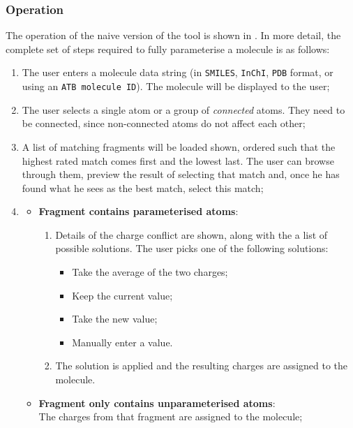 \subsubsection{Operation}
The operation of the naive version of the tool is shown in . In more detail, the complete set of steps required to fully parameterise a molecule is as follows:
\begin{enumerate}[itemsep=.1em, parsep=.2em, topsep=0em]
\item The user enters a molecule data string (in \verb|SMILES|, \verb|InChI|, \verb|PDB| format, or using an \verb|ATB molecule ID|). The molecule will be displayed to the user;
\item The user selects a single atom or a group of \emph{connected} atoms. They need to be connected, since non-connected atoms do not affect each other;
\item A list of matching fragments will be loaded shown, ordered such that the highest rated match comes first and the lowest last. The user can browse through them, preview the result of selecting that match and, once he has found what he sees as the best match, select this match;
\item
  \begin{itemize}[leftmargin=0cm, itemsep=.1em, parsep=.1em]
  \item[]{\bf Fragment contains parameterised atoms}:
    \begin{enumerate}
    \item
      Details of the charge conflict are shown, along with the a list of possible solutions. The user picks one of the following solutions:
      \begin{itemize}[itemsep=.1em, parsep=.2em, topsep=0em]
      \item Take the average of the two charges;
      \item Keep the current value;
      \item Take the new value;
      \item Manually enter a value.
      \end{itemize}
    \item The solution is applied and the resulting charges are assigned to the molecule.
    \end{enumerate}
  \item[] {\bf Fragment only contains unparameterised atoms}:\\
    The charges from that fragment are assigned to the molecule;
  \end{itemize}

\end{enumerate}
